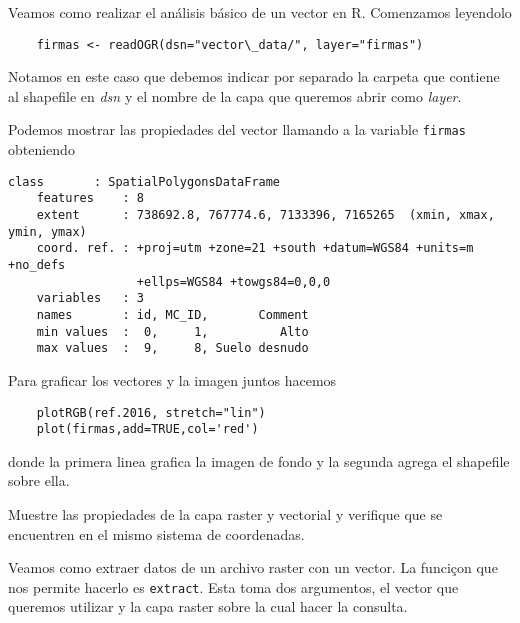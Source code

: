 \begin{exa}
    Veamos como realizar el an\'alisis b\'asico de un vector en R. Comenzamos
    leyendolo

    \begin{lstlisting}
    firmas <- readOGR(dsn="vector\_data/", layer="firmas")
    \end{lstlisting}

    Notamos en este caso que debemos indicar por separado la carpeta que
    contiene al shapefile en \emph{dsn} y el nombre de la capa que queremos
    abrir como \emph{layer}.

    Podemos mostrar las propiedades del vector llamando a la variable
    \texttt{firmas} obteniendo
    \begin{Verbatim}[fontsize=\small]
    class       : SpatialPolygonsDataFrame
    features    : 8
    extent      : 738692.8, 767774.6, 7133396, 7165265  (xmin, xmax, ymin, ymax)
    coord. ref. : +proj=utm +zone=21 +south +datum=WGS84 +units=m +no_defs
                  +ellps=WGS84 +towgs84=0,0,0
    variables   : 3
    names       : id, MC_ID,       Comment
    min values  :  0,     1,          Alto
    max values  :  9,     8, Suelo desnudo
    \end{Verbatim}

    Para graficar los vectores y la imagen juntos hacemos

    \begin{lstlisting}
    plotRGB(ref.2016, stretch="lin")
    plot(firmas,add=TRUE,col='red')
    \end{lstlisting}
    donde la primera linea grafica la imagen de fondo y la segunda agrega el
    shapefile sobre ella.
\end{exa}

\begin{act}
    Muestre las propiedades de la capa raster y vectorial y verifique
    que se encuentren en el mismo sistema de coordenadas.
\end{act}

Veamos como extraer datos de un archivo raster con un vector. La funciçon que
nos permite hacerlo es \texttt{extract}. Esta toma dos argumentos, el vector que queremos
utilizar y la capa raster sobre la cual hacer la consulta.

